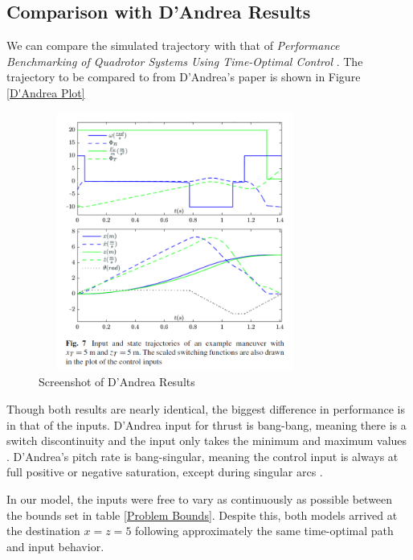\documentclass[12pt]{article}
\begin{document}
	\subsection{Comparison with D'Andrea Results}
	
	We can compare the simulated trajectory with that of \textit{Performance Benchmarking of Quadrotor Systems Using Time-Optimal Control} \cite{D'Andrea}. The trajectory to be compared to from D'Andrea's paper is shown in Figure \ref{D'Andrea Plot}
	
	
	\begin{figure}[H]
		\centerline{\includegraphics[width=9cm, height=8.5cm]{DAndrea_55_Plot.png}}
		\caption{\label{D'Andrea Plot} Screenshot of D'Andrea Results}
		\label{fig}
	\end{figure}
	
	Though both results are nearly identical, the biggest difference in performance is in that of the inputs. 
	D'Andrea input for thrust is bang-bang, meaning there is a switch discontinuity and the input only takes the minimum and maximum values \cite{BangBangControl}. D'Andrea's pitch rate is bang-singular, meaning the control input is always at full positive or negative saturation, except during singular arcs \cite{D'Andrea}.
	
	In our model, the inputs were free to vary as continuously as possible between the bounds set in table \ref{Problem Bounds}. Despite this, both models arrived at the destination $x=z=5$ following approximately the same time-optimal path and input behavior. 
	
	
	
\end{document}
